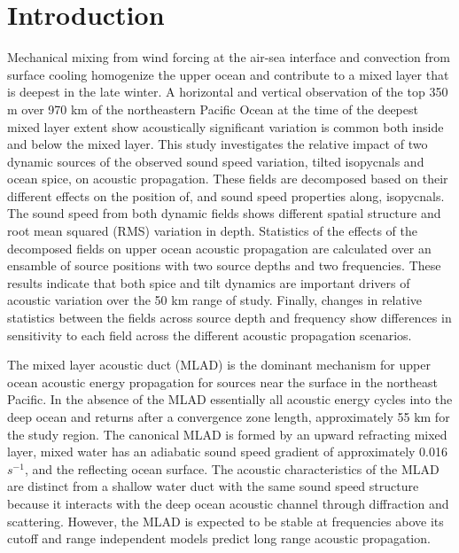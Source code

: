 \documentclass[preprint,NumberedRefs]{JASA}
\begin{document}
\section{\label{sec:intro} Introduction}
Mechanical mixing from wind forcing at the air-sea interface and convection from surface cooling homogenize the upper ocean and contribute to a mixed layer that is deepest in the late winter\citep{cole2010seasonal}. A horizontal and vertical observation of the top 350 m over 970 km of the northeastern Pacific Ocean at the time of the deepest mixed layer extent show acoustically significant variation is common both inside and below the mixed layer\citep{colosi2020observations}. This study investigates the relative impact of two dynamic sources of the observed sound speed variation, tilted isopycnals and ocean spice, on acoustic propagation. These fields are decomposed based on their different effects on the position of, and sound speed properties along, isopycnals\cite{dzieciuch2004}. The sound speed from both dynamic fields shows different spatial structure and root mean squared (RMS) variation in depth. Statistics of the effects of the decomposed fields on upper ocean acoustic propagation are calculated over an ensamble of source positions with two source depths and two frequencies. These results indicate that both spice and tilt dynamics are important drivers of acoustic variation over the 50 km range of study. Finally, changes in relative statistics between the fields across source depth and frequency show differences in sensitivity to each field across the different acoustic propagation scenarios.

The mixed layer acoustic duct (MLAD) is the dominant mechanism for upper ocean acoustic energy propagation for sources near the surface in the northeast Pacific. In the absence of the MLAD essentially all acoustic energy cycles into the deep ocean and returns after a convergence zone length\cite{jensen2011computational}, approximately 55 km for the study region. The canonical MLAD is formed by an upward refracting mixed layer, mixed water has an adiabatic sound speed gradient of approximately 0.016 $s^{-1}$, and the reflecting ocean surface. The acoustic characteristics of the MLAD are distinct from a shallow water duct with the same sound speed structure because it interacts with the deep ocean acoustic channel through diffraction\citep{porter93} and scattering\cite{colosi2020observations}. However, the MLAD is expected to be stable at frequencies above its cutoff\citep{Urick1982Prop} and range independent models predict long range acoustic propagation.
\end{document}
